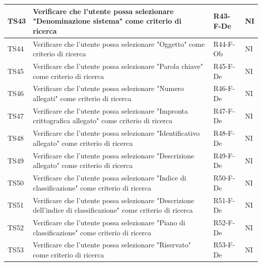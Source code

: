 \documentclass[a4paper,12pt]{article}
\begin{document}
\begin{longtable}{|M{1.2cm}|M{6.3cm}|M{2.5cm}|M{1.5cm}|}
                TS43 & Verificare che l'utente possa selezionare "Denominazione sistema" come criterio di ricerca & R43-F-De & NI \\
                \hline

                TS44 & Verificare che l'utente possa selezionare "Oggetto" come criterio di ricerca & R44-F-Ob & NI \\
                \hline

                TS45 & Verificare che l'utente possa selezionare "Parola chiave" come criterio di ricerca & R45-F-De & NI \\
                \hline

                TS46 & Verificare che l'utente possa selezionare "Numero allegati" come criterio di ricerca & R46-F-De & NI \\
                \hline

                TS47 & Verificare che l'utente possa selezionare "Impronta crittografica allegato" come criterio di ricerca & R47-F-De & NI \\
                \hline

                TS48 & Verificare che l'utente possa selezionare "Identificativo allegato" come criterio di ricerca & R48-F-De & NI \\
                \hline

                TS49 & Verificare che l'utente possa selezionare "Descrizione allegato" come criterio di ricerca & R49-F-De & NI \\
                \hline

                TS50 & Verificare che l'utente possa selezionare "Indice di classificazione" come criterio di ricerca & R50-F-De & NI \\
                \hline

                TS51 & Verificare che l'utente possa selezionare "Descrizione dell'indice di classificazione" come criterio di ricerca & R51-F-De & NI \\
                \hline

                TS52 & Verificare che l'utente possa selezionare "Piano di classificazione" come criterio di ricerca & R52-F-De & NI \\
                \hline

                TS53 & Verificare che l'utente possa selezionare "Riservato" come criterio di ricerca & R53-F-De & NI \\
                \hline


\end{longtable}
\end{document}
